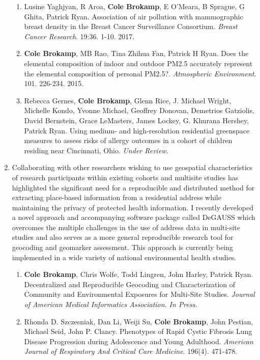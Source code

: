 \documentclass{nihbiosketch}
\begin{document}
\begin{enumerate}
\begin{enumerate}
	\item Lusine Yaghjyan, R Aroa, \textbf{Cole Brokamp}, E O'Meara, B Sprague, G Ghita, Patrick Ryan. Association of air pollution with mammographic breast density in the Breast Cancer Surveillance Consortium. \emph{Breast Cancer Research}. 19:36. 1-10. 2017.
	
	\item \textbf{Cole Brokamp}, MB Rao, Tina Zhihua Fan, Patrick H Ryan. Does the elemental composition of indoor and outdoor PM2.5 accurately represent the elemental composition of personal PM2.5?. \emph{Atmospheric Environment}. 101. 226-234. 2015.
	
	\item Rebecca Gernes, \textbf{Cole Brokamp}, Glenn Rice, J. Michael Wright,
	Michelle Kondo, Yvonne Michael, Geoffrey Donovan, Demetrios Gatziolis,
	David Bernstein, Grace LeMasters, James Lockey, G. Khurana Hershey,
	Patrick Ryan. Using medium- and high-resolution residential greenspace
	measures to assess risks of allergy outcomes in a cohort of children
	residing near Cincinnati, Ohio. \emph{Under Review}.
	
\end{enumerate}

\item Collaborating with other researchers wishing to use geospatial characteristics of research participants within existing cohorts and multisite studies has highlighted the significant need for a reproducible and distributed method for extracting place-based information from a residential address while maintaining the privacy of protected health information. I recently developed a novel approach and accompanying software package called DeGAUSS which overcomes the multiple challenges in the use of address data in multi-site studies and also serves as a more general reproducible research tool for geocoding and geomarker assessment. This approach is currently being implemented in a wide variety of national environmental health studies.

\begin{enumerate}

	\item \textbf{Cole Brokamp}, Chris Wolfe, Todd Lingren, John Harley, Patrick Ryan. Decentralized and Reproducible Geocoding and Characterization of Community and Environmental Exposures for Multi-Site Studies. \emph{Journal of American Medical Informatics Association.} \emph{In Press}.
		
	\item Rhonda D. Szczesniak, Dan Li, Weiji Su, \textbf{Cole Brokamp}, John Pestian, Michael Seid, John P. Clancy. Phenotypes of Rapid Cystic Fibrosis Lung Disease Progression during Adolescence and Young Adulthood. \emph{American Journal of Respiratory And Critical Care Medicine}. 196(4). 471-478.
	

\end{enumerate}
\end{enumerate}
\end{document}
